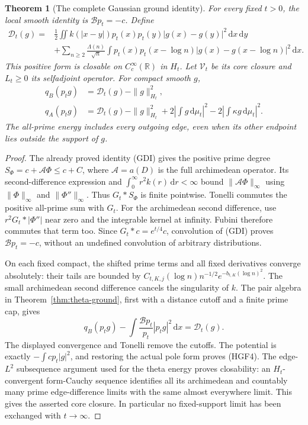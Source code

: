 \documentclass[11pt]{article}
\newtheorem{theorem}{Theorem}
\theoremstyle{remark}\newtheorem{remark}[theorem]{Remark}
\newcommand{\R}{\mathbb R}
\newcommand{\dd}{\,\mathrm d}
\begin{document}
\begin{theorem}[The complete Gaussian ground identity]
\label{thm:heat-ground}
For every fixed $t>0$, the local smooth identity is
$\mathcal Bp_t=-c$. Define
\[
\begin{split}
 \mathcal D_t(g)={}&\frac12\iint k(|x-y|)p_t(x)p_t(y)
                              |g(x)-g(y)|^2\dd x\dd y\\
 &+\sum_{n\ge2}\frac{\Lambda(n)}{\sqrt n}
       \int p_t(x)p_t(x-\log n)
                          |g(x)-g(x-\log n)|^2\dd x .
\end{split}                                                   \tag{HGF3}
\]
This positive form is closable on $C_c^\infty(\R)$ in $H_t$.
Let $\mathcal V_t$ be its core closure and $L_t\ge0$ its
selfadjoint operator. For compact smooth $g$,
\[
\begin{split}
 q_B(p_tg)&=\mathcal D_t(g)-\|g\|_{H_t}^2,\\
 q_A(p_tg)&=\mathcal D_t(g)-\|g\|_{H_t}^2
       +2\left|\int g\dd\mu_t\right|^2
       -2\left|\int\kappa g\dd\mu_t\right|^2 .
\end{split}                                                   \tag{HGF4}
\]
The all-prime energy includes every outgoing edge, even when its
other endpoint lies outside the support of $g$.
\end{theorem}
\begin{proof}
The already proved identity (GDI) gives the positive prime degree
$S_\Phi=c+\mathcal A\Phi\le c+C$, where $\mathcal A=a(D)$ is
the full archimedean operator. Its second-difference expression
and $\int_0^\infty r^2k(r)\dd r<\infty$ bound
$\|\mathcal A\Phi\|_\infty$ using $\|\Phi\|_\infty$ and
$\|\Phi''\|_\infty$. Thus $G_t*S_\Phi$ is finite pointwise.
Tonelli commutes the positive all-prime sum with $G_t$.
For the archimedean second difference, use
$r^2G_t*|\Phi''|$ near zero and the integrable kernel at infinity.
Fubini therefore commutes that term too. Since
$G_t*c=e^{t/4}c$, convolution of (GDI) proves
$\mathcal Bp_t=-c$, without an undefined convolution of
arbitrary distributions.

On each fixed compact, the shifted prime terms and all fixed
derivatives converge absolutely: their tails are bounded by
$C_{t,K,j}(\log n)n^{-1/2}e^{-b_{t,K}(\log n)^2}$.
The small archimedean second difference cancels the singularity
of $k$. The pair algebra in Theorem~\ref{thm:theta-ground},
first with a distance cutoff and a finite prime cap, gives
\[
 q_B(p_tg)-\int\frac{\mathcal Bp_t}{p_t}|p_tg|^2\dd x
                                                    =\mathcal D_t(g).
\]
The displayed convergence and Tonelli remove the cutoffs.
The potential is exactly $-\int c p_t|g|^2$, and restoring
the actual pole form proves (HGF4).
The edge-$L^2$ subsequence argument used for the theta energy
proves closability: an $H_t$-convergent form-Cauchy sequence
identifies all its archimedean and countably many prime
edge-difference limits with the same almost everywhere limit.
This gives the asserted core closure. In particular no
fixed-support limit has been exchanged with $t\to\infty$.
\end{proof}
\end{document}
